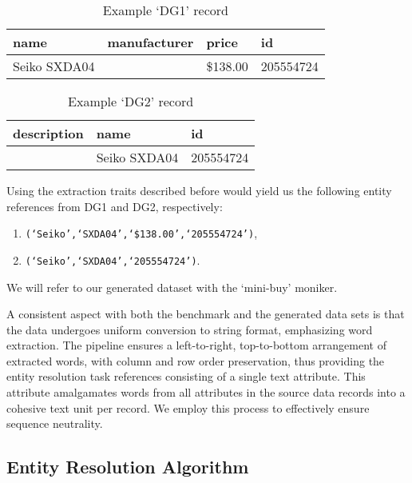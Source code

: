 \begin{table}[ht]
    \setlength\tabcolsep{6pt}
    \centering
    \begin{tabular}{llll}
        \toprule
        name & manufacturer & price & id \\
        \midrule
        Seiko SXDA04 & & \$138.00 & 205554724 \\
        \bottomrule
    \end{tabular}
    \caption{Example `DG1' record}\label{tab:dg1-record}
\end{table}

\begin{table}[ht]
    \setlength\tabcolsep{5pt}
    \centering
    \begin{tabular}[b]{lll}
        \toprule
        description&name&id \\
        \midrule
        &Seiko SXDA04&205554724 \\
        \bottomrule
    \end{tabular}
    \caption{Example `DG2' record}\label{tab:dg2-record}
\end{table}

Using the extraction traits described before would yield us the
following entity references from DG1 and DG2, respectively:
\begin{enumerate}
    \item \texttt{(`Seiko',`SXDA04',`\$138.00',`205554724')},
    \item \texttt{(`Seiko',`SXDA04',`205554724')}.
\end{enumerate}

We will refer to our generated dataset with the `mini-buy' moniker.

A consistent aspect with both the benchmark and the generated data sets is that
the data undergoes uniform conversion to string format, emphasizing word
extraction.
The pipeline ensures a left-to-right, top-to-bottom arrangement of extracted
words, with column and row order preservation, thus providing the entity
resolution task references consisting of a single text attribute.
This attribute amalgamates words from all attributes in the source data records
into a cohesive text unit per record.
We employ this process to effectively ensure sequence neutrality.

\subsection{Entity Resolution Algorithm}\label{subsec:entity-resolution-algorithm}

